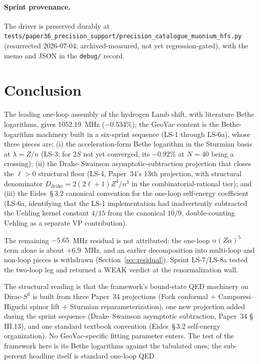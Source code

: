 \documentclass[11pt]{article}
\begin{document}
\paragraph{Sprint provenance.}
The driver is preserved durably at
\texttt{tests/paper36\_precision\_support/precision\_catalogue\_muonium\_hfs.py}
(resurrected 2026-07-04; archived-measured, not yet regression-gated),
with the memo and JSON in the \texttt{debug/} record.

\section{Conclusion}
\label{sec:conclusion}

The leading one-loop assembly of the hydrogen Lamb shift, with
literature Bethe logarithms, gives 1052.19~MHz ($-0.534\%$); the
GeoVac content is the Bethe-logarithm machinery built in a six-sprint
sequence (LS-1 through LS-6a), whose three pieces are:
(i) the acceleration-form Bethe logarithm in the Sturmian basis at
$\lambda = Z/n$ (LS-3; for 2$S$ not yet converged, its $-0.92\%$ at
$N = 40$ being a crossing); (ii) the Drake--Swainson asymptotic-subtraction
projection that closes the $\ell > 0$ structural floor (LS-4,
Paper~34's 13th projection, with structural denominator
$D_\text{drake} = 2(2\ell + 1)Z^4/n^3$ in the combinatorial-rational
tier); and (iii) the Eides~\S\,3.2 canonical convention for the
one-loop self-energy coefficient (LS-6a, identifying that the LS-1
implementation had inadvertently subtracted the Uehling kernel
constant $4/15$ from the canonical $10/9$, double-counting Uehling
as a separate VP contribution).

The remaining $-5.65$~MHz residual is not attributed: the one-loop
$\alpha(Z\alpha)^5$ term alone is about $+6.9$~MHz, and an earlier
decomposition into multi-loop and non-loop pieces is withdrawn
(Section~\ref{sec:residual}).  Sprint LS-7/LS-8a tested the two-loop
leg and returned a WEAK verdict at the renormalization wall.

The structural reading is that the framework's bound-state QED
machinery on Dirac-$S^3$ is built from three Paper~34 projections
(Fock conformal + Camporesi--Higuchi spinor lift + Sturmian
reparameterization), one new projection added during the sprint
sequence (Drake--Swainson asymptotic subtraction, Paper~34
\S\,III.13), and one standard textbook convention (Eides~\S\,3.2
self-energy organization).  No GeoVac-specific fitting parameter
enters.  The test of the framework here is its Bethe logarithms
against the tabulated ones; the sub-percent headline itself is
standard one-loop QED.
\end{document}
